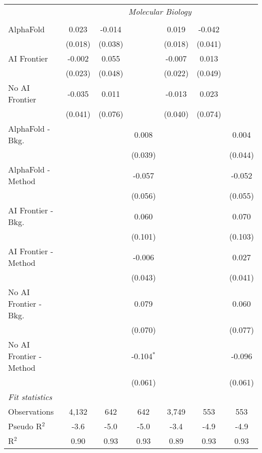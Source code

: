 \begin{tabular}{lcccccc}
 & \multicolumn{6}{c}{\textit{Molecular Biology}} \\ \\
   AlphaFold               & 0.023   & -0.014  &              & 0.019   & -0.042  &   \\   
                           & (0.018) & (0.038) &              & (0.018) & (0.041) &   \\   
   AI Frontier             & -0.002  & 0.055   &              & -0.007  & 0.013   &   \\   
                           & (0.023) & (0.048) &              & (0.022) & (0.049) &   \\   
   No AI Frontier          & -0.035  & 0.011   &              & -0.013  & 0.023   &   \\   
                           & (0.041) & (0.076) &              & (0.040) & (0.074) &   \\   
   AlphaFold - Bkg.        &         &         & 0.008        &         &         & 0.004\\   
                           &         &         & (0.039)      &         &         & (0.044)\\   
   AlphaFold - Method      &         &         & -0.057       &         &         & -0.052\\   
                           &         &         & (0.056)      &         &         & (0.055)\\   
   AI Frontier - Bkg.      &         &         & 0.060        &         &         & 0.070\\   
                           &         &         & (0.101)      &         &         & (0.103)\\   
   AI Frontier - Method    &         &         & -0.006       &         &         & 0.027\\   
                           &         &         & (0.043)      &         &         & (0.041)\\   
   No AI Frontier - Bkg.   &         &         & 0.079        &         &         & 0.060\\   
                           &         &         & (0.070)      &         &         & (0.077)\\   
   No AI Frontier - Method &         &         & -0.104$^{*}$ &         &         & -0.096\\   
                           &         &         & (0.061)      &         &         & (0.061)\\   
   \midrule
   \emph{Fit statistics}\\
   Observations            & 4,132   & 642     & 642          & 3,749   & 553     & 553\\  
   Pseudo R$^2$            & -3.6    & -5.0    & -5.0         & -3.4    & -4.9    & -4.9\\  
   R$^2$                   & 0.90    & 0.93    & 0.93         & 0.89    & 0.93    & 0.93\\  
   

\end{tabular}
